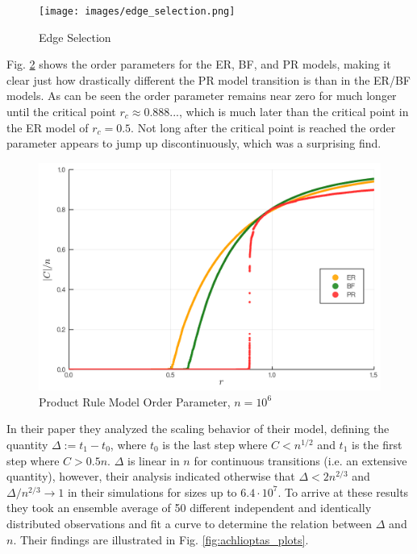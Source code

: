 \begin{figure}[H]
	\centering
	\texttt{[image: images/edge\_selection.png]}
	\caption{Edge Selection}
	\label{fig:edge_selection}
\end{figure}

Fig. \ref{fig:ER_BF_PR_transition} shows the order parameters for the ER, BF, and PR models, making it clear just how drastically different the PR model transition is than in the ER/BF models.
As can be seen the order parameter remains near zero for much longer until the critical point $r_c \approx 0.888...$, which is much later than the critical point in the ER model of $r_c = 0.5$.
Not long after the critical point is reached the order parameter appears to jump up discontinuously, which was a surprising find.

\begin{figure}[H]
	\centering
	\includegraphics[width=350pt]{images/Network_ER_BF_PR_1e6_order_param.png}
	\caption{Product Rule Model Order Parameter, $n = 10^6$}
	\label{fig:ER_BF_PR_transition}
\end{figure}

In their paper they analyzed the scaling behavior of their model, defining the quantity $\Delta := t_1 - t_0$, where $t_0$ is the last step where $C < n^{1/2}$ and $t_1$ is the first step where $C > 0.5n$.
$\Delta$ is linear in $n$ for continuous transitions (i.e. an extensive quantity), however, their analysis indicated otherwise that $\Delta < 2n^{2/3}$ and $\Delta / n^{2/3} \rightarrow 1$ in their simulations for sizes up to $6.4 \cdot 10^7$.
To arrive at these results they took an ensemble average of 50 different independent and identically distributed observations and fit a curve to determine the relation between $\Delta$ and $n$.
Their findings are illustrated in Fig. \ref{fig:achlioptas_plots}.

